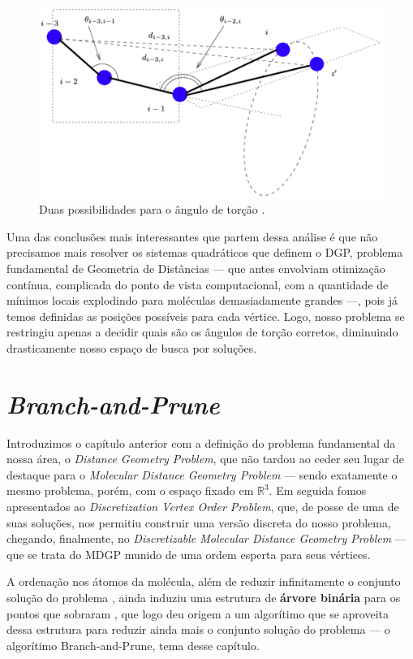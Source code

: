 \documentclass[a4paper,12pt]{article}
\begin{document}
 	\begin{figure}[H]
 		\begin{center}
 			\includegraphics[width=0.85\linewidth]{torcao.png}
 		\end{center}
 		\caption{Duas possibilidades para o ângulo de torção \cite{carlile:DMDGP}.}
 		\label{fig:torcao}
 	\end{figure}
 	
 	Uma das conclusões mais interessantes que partem dessa análise é que não precisamos mais resolver os sistemas quadráticos que definem o DGP, problema fundamental de Geometria de Distâncias --- que antes envolviam otimização contínua, complicada do ponto de vista computacional, com a quantidade de mínimos locais explodindo para moléculas demasiadamente grandes ---, pois já temos definidas as posições possíveis para cada vértice. Logo, nosso problema se restringiu apenas a decidir quais são os ângulos de torção corretos, diminuindo drasticamente nosso espaço de busca por soluções.
 	
	\newpage
	\section{\textit{Branch-and-Prune} \label{sec:bp}}
	 Introduzimos o capítulo anterior com a definição do problema fundamental da nossa área, o \textit{Distance Geometry Problem}, que não tardou ao ceder seu lugar de destaque para o \textit{Molecular Distance Geometry Problem} --- sendo exatamente o mesmo problema, porém, com o espaço fixado em $\mathbb{R}^3$. Em seguida fomos apresentados ao \textit{Discretization Vertex Order Problem}, que, de posse de uma de suas soluções, nos permitiu construir uma versão discreta do nosso problema, chegando, finalmente, no \textit{Discretizable Molecular Distance Geometry Problem} --- que se trata do MDGP munido de uma ordem esperta para seus vértices.
	
	A ordenação nos átomos da molécula, além de reduzir infinitamente o conjunto solução do problema \cite{carlileBook31Coloquio}, ainda induziu uma estrutura de \textbf{árvore binária} para os pontos que sobraram \cite{fidalgotese}, que logo deu origem a um algorítimo que se aproveita dessa estrutura para reduzir ainda mais o conjunto solução do problema --- o algorítimo Branch-and-Prune, tema desse capítulo.
	
\end{document}
